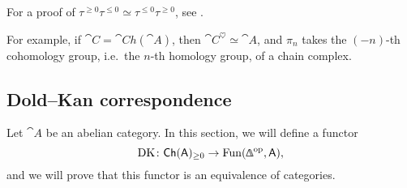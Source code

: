 For a proof of $\tau^{\geq0}\tau^{\leq0}\simeq\tau^{\leq0}\tau^{\geq0}$,
see \cite[Proposition~1.2.1.10]{ha}.

For example, if $\cat{C}=\cat{Ch}(\cat{A})$,
then $\cat{C}^\heartsuit\simeq\cat{A}$,
and $\pi_n$ takes the $(-n)$-th cohomology group,
i.e.\ the $n$-th homology group, of a chain complex.

\subsection{Dold--Kan correspondence}

Let $\cat{A}$ be an abelian category.
In this section, we will define a functor 
\[\operatorname{DK}\:\cat{Ch}(\cat{A})_{\geq0} \to \operatorname{Fun}(\bfDelta\op,\cat{A}),\]
and we will prove that this functor 
is an equivalence of categories.

